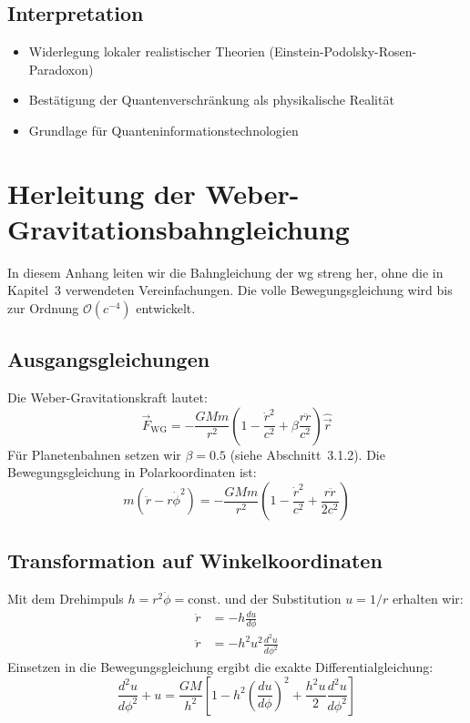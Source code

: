 \subsection{Interpretation}
\begin{itemize}
\item Widerlegung lokaler realistischer Theorien (Einstein-Podolsky-Rosen-Paradoxon)
\item Bestätigung der Quantenverschränkung als physikalische Realität
\item Grundlage für Quanteninformationstechnologien
\end{itemize}

\newpage
\section{Herleitung der Weber-Gravitationsbahngleichung}
\label{sec:exakte_herleitung}

In diesem Anhang leiten wir die Bahngleichung der \gls{wg} streng her, ohne die in Kapitel~3 verwendeten Vereinfachungen. Die volle Bewegungsgleichung wird bis zur
Ordnung $\mathcal{O}(c^{-4})$ entwickelt.

\subsection{Ausgangsgleichungen}
Die Weber-Gravitationskraft lautet:
\begin{equation}
\vec{F}_{\text{WG}} = -\frac{GMm}{r^2} \left(1 - \frac{\dot{r}^2}{c^2} + \beta \frac{r\ddot{r}}{c^2}\right)\hat{\vec{r}}
\end{equation}
Für Planetenbahnen setzen wir $\beta = 0.5$ (siehe Abschnitt~3.1.2). Die Bewegungsgleichung in Polarkoordinaten ist:
\begin{equation}
m\left(\ddot{r} - r\dot{\phi}^2\right) = -\frac{GMm}{r^2}\left(1 - \frac{\dot{r}^2}{c^2} + \frac{r\ddot{r}}{2c^2}\right)
\end{equation}

\subsection{Transformation auf Winkelkoordinaten}
Mit dem Drehimpuls $h = r^2\dot{\phi} = \text{const.}$ und der Substitution $u = 1/r$ erhalten wir:
\begin{align}
\dot{r} &= -h\frac{du}{d\phi} \\
\ddot{r} &= -h^2u^2\frac{d^2u}{d\phi^2}
\end{align}
Einsetzen in die Bewegungsgleichung ergibt die exakte Differentialgleichung:
\begin{equation}
\frac{d^2u}{d\phi^2} + u = \frac{GM}{h^2}\left[1 - h^2\left(\frac{du}{d\phi}\right)^2 + \frac{h^2u}{2}\frac{d^2u}{d\phi^2}\right]
\end{equation}

